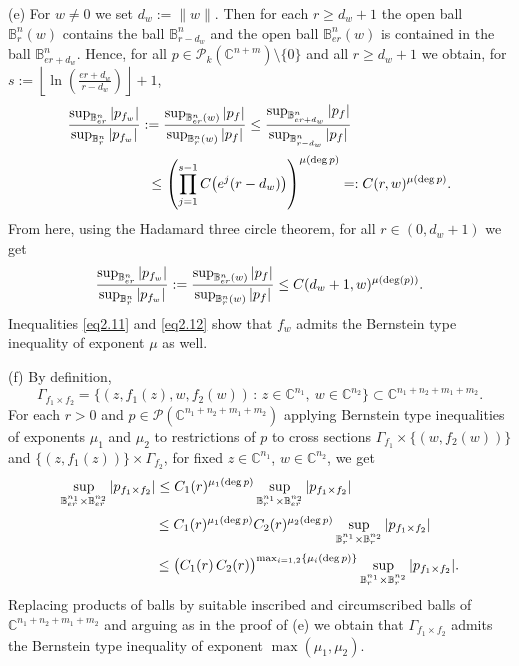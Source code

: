\documentclass[11pt, oneside]{amsart}
\begin{document}
(e)  For $w\ne 0$ we set $d_w:=\|w\|$.  Then for each $r\ge d_w+1$ the open ball $\mathbb B_r^n(w)$ contains the ball $\mathbb B_{r-d_w}^n$ and the open ball $\mathbb B_{er}^n(w)$ is contained in the ball $\mathbb B_{er+d_w}^n$. Hence,
for all $p\in\mathcal P_k(\mathbb C^{n+m})\setminus\{0\}$ and all $r\ge d_w+1$ we obtain, for $s:=\left\lfloor\ln\left(\frac{er+d_w}{r-d_w}\right)\right\rfloor+1$,
\begin{equation}\label{eq2.11}
\begin{array}{l}
\displaystyle \frac{\sup_{\mathbb B^n_{er}} |p_{f_w}|}{\sup_{\mathbb B^n_r} |p_{f_w}|}:=
\frac{\sup_{\mathbb B^n_{er}(w)} |p_f|}{\sup_{\mathbb B^n_r(w)} |p_f|} \le \frac{\sup_{\mathbb B^n_{er+d_w}} |p_f|}{\sup_{\mathbb B^n_{r-d_w}} |p_f|}\medskip\\
\displaystyle \qquad\qquad\qquad\le\left(\prod_{j=1}^{s-1}C\bigl(e^j(r-d_w)\bigr)\right)^{\mu({\rm deg}\,p)}=:C(r,w)^{\mu({\rm deg}\,p)}.
\end{array}
\end{equation}
From here, using the Hadamard three circle theorem, for all $r\in (0,d_w+1)$ we get
\begin{equation}\label{eq2.12}
\frac{\sup_{\mathbb B^n_{er}} |p_{f_w}|}{\sup_{\mathbb B^n_r} |p_{f_w}|}:=\frac{\sup_{\mathbb B^n_{er}(w)} |p_f|}{\sup_{\mathbb B^n_r(w)} |p_f|}\le C(d_w+1,w)^{\mu({\rm deg}(p))}.
\end{equation}
Inequalities \eqref{eq2.11} and \eqref{eq2.12} show that $f_w$ admits the Bernstein type inequality of exponent $\mu$ as well.\smallskip

(f) By definition, 
\[
\Gamma_{f_1\times f_2}=\{ (z,f_1(z),w, f_2(w))\, : \,  z\in\mathbb C^{n_1},\ w\in\mathbb C^{n_2}\}\subset\mathbb C^{n_1+n_2+m_1+m_2}.
\]
For each $r>0$  and $p\in\mathcal P(\mathbb C^{n_1+n_2+m_1+m_2})$  applying Bernstein type inequalities of exponents $\mu_1$ and $\mu_2$ to restrictions of $p$ to cross sections $\Gamma_{f_1}\times \{(w,f_2(w))\}$ and $\{(z,f_1(z))\}\times\Gamma_{f_2}$, for fixed $z\in\mathbb C^{n_1}$, $w\in\mathbb C^{n_2}$, we get
\[
\begin{array}{l}
\displaystyle
\sup_{\mathbb B_{er}^{n_1}\times \mathbb B_{er}^{n_2}}|p_{f_1\times f_2}|\le C_1(r)^{\mu_1({\rm deg}\,p)}\sup_{\mathbb B_{r}^{n_1}\times \mathbb B_{er}^{n_2}}|p_{f_1\times f_2}|\medskip\\
\displaystyle \quad\qquad\qquad\qquad\le C_1(r)^{\mu_1({\rm deg}\,p)} C_2(r)^{\mu_2({\rm deg}\,p)}\sup_{\mathbb B_{r}^{n_1}\times \mathbb B_{r}^{n_2}}|p_{f_1\times f_2}|\medskip\\
\displaystyle\quad\qquad\qquad\qquad\le \bigl(C_1(r)\, C_2(r)\bigr)^{\max_{i=1,2}\{\mu_i({\rm deg}\,p)\}}\sup_{\mathbb B_{r}^{n_1}\times \mathbb B_{r}^{n_2}}|p_{f_1\times f_2}|.
\end{array}
\]
Replacing products of balls by suitable inscribed and circumscribed balls of $\mathbb C^{n_1+n_2+m_1+m_2}$ and arguing as in the proof of (e) we obtain that
$\Gamma_{f_1\times f_2}$ admits the Bernstein type inequality of exponent $\max(\mu_1,\mu_2)$.
\end{document}
